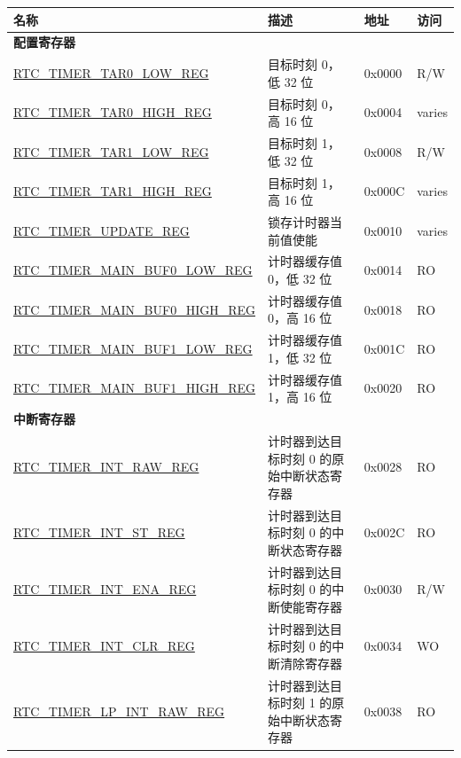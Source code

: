 \begin{longtable}{ | p{6cm} | p{7.2cm} | p{1.3cm} | p{1cm} | }
\hline\rowcolor{lightgray}
名称 & 描述 &  地址 & 访问 \\ \hline
\endhead
\multicolumn{4}{|l|}{\textbf{配置寄存器}} \\ \hline
\hyperref[regdesc:RTCTIMERTAR0LOWREG]{RTC\_TIMER\_TAR0\_LOW\_REG} & 目标时刻 0，低 32 位 & 0x0000 & R/W \\ \hline
\hyperref[regdesc:RTCTIMERTAR0HIGHREG]{RTC\_TIMER\_TAR0\_HIGH\_REG} & 目标时刻 0，高 16 位 & 0x0004 & varies \\ \hline
\hyperref[regdesc:RTCTIMERTAR1LOWREG]{RTC\_TIMER\_TAR1\_LOW\_REG} & 目标时刻 1，低 32 位 & 0x0008 & R/W \\ \hline
\hyperref[regdesc:RTCTIMERTAR1HIGHREG]{RTC\_TIMER\_TAR1\_HIGH\_REG} & 目标时刻 1，高 16 位 & 0x000C & varies \\ \hline
\hyperref[regdesc:RTCTIMERUPDATEREG]{RTC\_TIMER\_UPDATE\_REG} & 锁存计时器当前值使能 & 0x0010 & varies \\ \hline
\hyperref[regdesc:RTCTIMERMAINBUF0LOWREG]{RTC\_TIMER\_MAIN\_BUF0\_LOW\_REG} & 计时器缓存值 0，低 32 位 & 0x0014 & RO\\ \hline
\hyperref[regdesc:RTCTIMERMAINBUF0HIGHREG]{RTC\_TIMER\_MAIN\_BUF0\_HIGH\_REG} & 计时器缓存值 0，高 16 位 & 0x0018 & RO\\ \hline
\hyperref[regdesc:RTCTIMERMAINBUF1LOWREG]{RTC\_TIMER\_MAIN\_BUF1\_LOW\_REG} & 计时器缓存值 1，低 32 位 & 0x001C & RO\\ \hline
\hyperref[regdesc:RTCTIMERMAINBUF1HIGHREG]{RTC\_TIMER\_MAIN\_BUF1\_HIGH\_REG} & 计时器缓存值 1，高 16 位 & 0x0020 & RO\\ \hline
\multicolumn{4}{|l|}{\textbf{中断寄存器}} \\ \hline
\hyperref[regdesc:RTCTIMERINTRAWREG]{RTC\_TIMER\_INT\_RAW\_REG} & 计时器到达目标时刻 0 的原始中断状态寄存器 & 0x0028 & RO\\ \hline
\hyperref[regdesc:RTCTIMERINTSTREG]{RTC\_TIMER\_INT\_ST\_REG} & 计时器到达目标时刻 0 的中断状态寄存器 & 0x002C & RO\\ \hline
\hyperref[regdesc:RTCTIMERINTENAREG]{RTC\_TIMER\_INT\_ENA\_REG} & 计时器到达目标时刻 0 的中断使能寄存器 & 0x0030 & R/W \\ \hline
\hyperref[regdesc:RTCTIMERINTCLRREG]{RTC\_TIMER\_INT\_CLR\_REG} & 计时器到达目标时刻 0 的中断清除寄存器 & 0x0034 & WO \\ \hline
\hyperref[regdesc:RTCTIMERLPINTRAWREG]{RTC\_TIMER\_LP\_INT\_RAW\_REG} & 计时器到达目标时刻 1 的原始中断状态寄存器 & 0x0038 & RO\\ \hline

\end{longtable}
